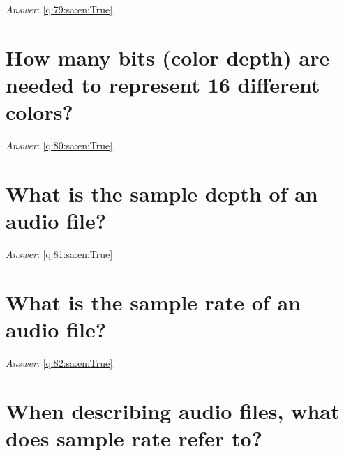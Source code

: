 \documentclass[a4paper,11pt,oneside]{book}
\begin{document}
\begin{sloppypar}
\vspace{1cm}

\textit{Answer}: \autoref{q:79:sa:en:True}



\section{How many bits (color depth) are needed to represent 16 different colors?}

\label{q:80:sa:en:False}

\vspace{2cm}

\noindent\makebox[\textwidth]{\hrulefill}

\vspace{1cm}

\textit{Answer}: \autoref{q:80:sa:en:True}



\section{What is the sample depth of an audio file?}

\label{q:81:sa:en:False}

\vspace{2cm}

\noindent\makebox[\textwidth]{\hrulefill}

\vspace{1cm}

\textit{Answer}: \autoref{q:81:sa:en:True}



\section{What is the sample rate of an audio file?}

\label{q:82:sa:en:False}

\vspace{2cm}

\noindent\makebox[\textwidth]{\hrulefill}

\vspace{1cm}

\textit{Answer}: \autoref{q:82:sa:en:True}



\section{When describing audio files, what does sample rate refer to?}


\end{sloppypar}
\end{document}
